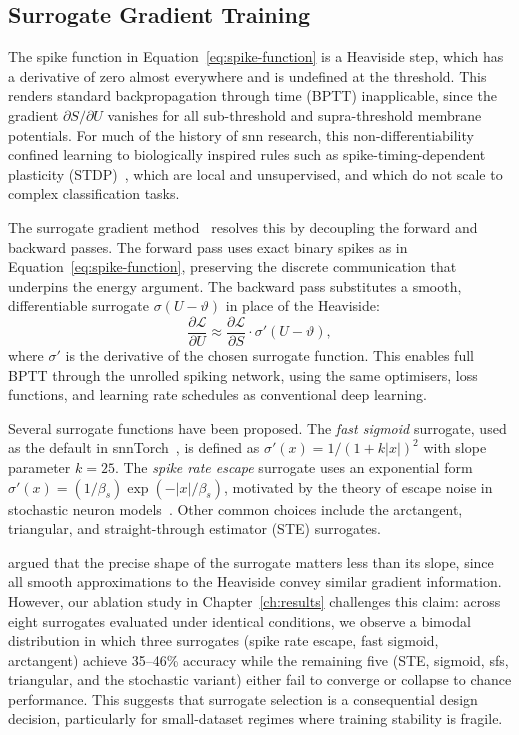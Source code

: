 \subsection{Surrogate Gradient Training}
\label{subsec:surrogate}

The spike function in Equation~\eqref{eq:spike-function} is a Heaviside step, which has a derivative of zero almost everywhere and is undefined at the threshold. This renders standard backpropagation through time (BPTT) inapplicable, since the gradient $\partial S / \partial U$ vanishes for all sub-threshold and supra-threshold membrane potentials. For much of the history of \gls{snn} research, this non-differentiability confined learning to biologically inspired rules such as spike-timing-dependent plasticity (STDP)~\citep{bi1998}, which are local and unsupervised, and which do not scale to complex classification tasks.

The surrogate gradient method~\citep{neftci2019,zenke2021} resolves this by decoupling the forward and backward passes. The forward pass uses exact binary spikes as in Equation~\eqref{eq:spike-function}, preserving the discrete communication that underpins the energy argument. The backward pass substitutes a smooth, differentiable surrogate $\sigma(U - \vartheta)$ in place of the Heaviside:
\begin{equation}
    \frac{\partial \mathcal{L}}{\partial U} \approx \frac{\partial \mathcal{L}}{\partial S} \cdot \sigma'(U - \vartheta),
    \label{eq:surrogate-gradient}
\end{equation}
where $\sigma'$ is the derivative of the chosen surrogate function. This enables full BPTT through the unrolled spiking network, using the same optimisers, loss functions, and learning rate schedules as conventional deep learning.

Several surrogate functions have been proposed. The \emph{fast sigmoid} surrogate, used as the default in snnTorch~\citep{eshraghian2023}, is defined as $\sigma'(x) = 1 / (1 + k|x|)^2$ with slope parameter $k = 25$. The \emph{spike rate escape} surrogate uses an exponential form $\sigma'(x) = (1/\beta_s) \exp(-|x|/\beta_s)$, motivated by the theory of escape noise in stochastic neuron models~\citep{gerstner2002,gygax2025}. Other common choices include the arctangent, triangular, and straight-through estimator (STE) surrogates.

\citet{zenke2021} argued that the precise shape of the surrogate matters less than its slope, since all smooth approximations to the Heaviside convey similar gradient information. However, our ablation study in Chapter~\ref{ch:results} challenges this claim: across eight surrogates evaluated under identical conditions, we observe a bimodal distribution in which three surrogates (spike rate escape, fast sigmoid, arctangent) achieve 35--46\% accuracy while the remaining five (STE, sigmoid, sfs, triangular, and the stochastic variant) either fail to converge or collapse to chance performance. This suggests that surrogate selection is a consequential design decision, particularly for small-dataset regimes where training stability is fragile.

